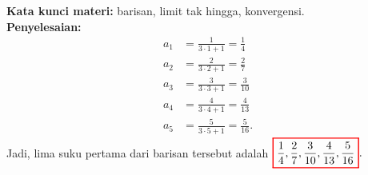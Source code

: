 \documentclass[10pt,openany,a4paper]{article}
\theoremstyle{definition}
\theoremstyle{definition}
\theoremstyle{plain}
\newenvironment{jawab}[2][tes]{
\textbf{Kata kunci materi:} #1.\\
\textbf{Penyelesaian:} #2
}{}
\newenvironment{jawaban}[2][tes]{
\colorlet{oldcolor}{.}
        \color{red}
        \setlength{\fboxrule}{1pt}\boxed{\color{oldcolor}#2}\color{oldcolor}.
}{}
\begin{document}
\begin{enumerate}
\begin{jawab}[barisan, limit tak hingga, konvergensi]
{                \allowdisplaybreaks
                    \begin{align*}
                        a_1 &= \frac{1}{3\cdot 1 + 1} = \frac{1}{4} \\
                        a_2 &= \frac{2}{3\cdot 2 + 1} = \frac{2}{7} \\
                        a_3 &= \frac{3}{3\cdot 3 + 1} = \frac{3}{10} \\
                        a_4 &= \frac{4}{3\cdot 4 + 1} = \frac{4}{13} \\
                        a_5 &= \frac{5}{3\cdot 5 + 1} = \frac{5}{16}.
                    \end{align*}
                    Jadi, lima suku pertama dari barisan tersebut adalah $\begin{jawaban}{\frac{1}{4}, \frac{2}{7}, \frac{3}{10}, \frac{4}{13}, \frac{5}{16}}\end{jawaban}$

}
\end{jawab}
\end{enumerate}
\end{document}
